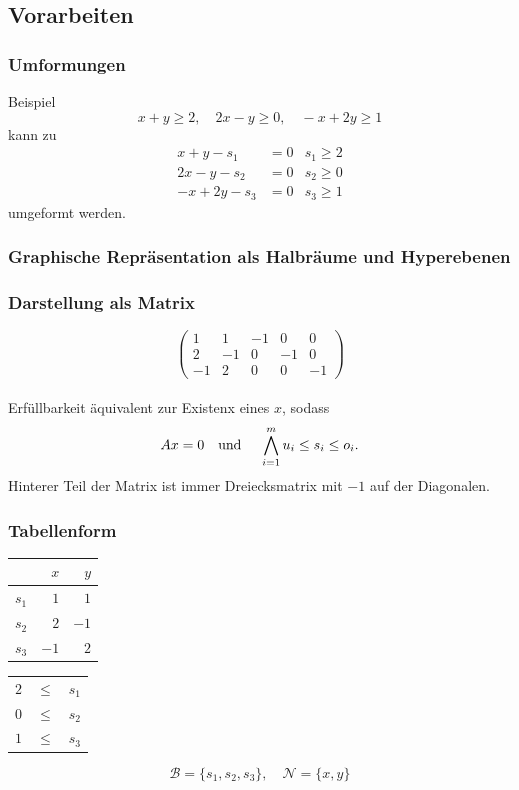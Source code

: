 \documentclass[hyperref={pdfpagelabels=false}]{beamer}
\begin{document}
\subsection{Vorarbeiten}
\begin{frame}
	\frametitle{Umformungen}
	\begin{block}{Beispiel}
		\[ x + y \geq 2, \quad 2x - y \geq 0, \quad -x + 2y \geq 1 \]
		kann zu
		\begin{align*}
			x + y - s_1 &= 0 & s_1 \geq 2 \\
			2x - y - s_2 &= 0 & s_2 \geq 0 \\
			-x + 2y - s_3 &= 0 & s_3 \geq 1
		\end{align*}
		umgeformt werden.
	\end{block}
\end{frame}
\begin{frame}
	\frametitle{Graphische Repräsentation als Halbräume und Hyperebenen}
	\begin{figure}
	\end{figure}
\end{frame}
\begin{frame}
	\frametitle{Darstellung als Matrix}
	\[
	\begin{pmatrix}
		1 & 1 & -1 & 0 & 0 \\
		2 & -1 & 0 & -1 & 0 \\
		-1 & 2 & 0 & 0 & -1
	\end{pmatrix}
	\]
	\mbox{}\\
	Erfüllbarkeit äquivalent zur Existenx eines $x$, sodass
	\[ Ax = 0 \text{\quad und \quad} \bigwedge_{i=1}^m u_i \leq s_i \leq o_i. \]
	Hinterer Teil der Matrix ist immer Dreiecksmatrix mit $-1$ auf der Diagonalen.
\end{frame}
\begin{frame}
	\frametitle{Tabellenform}
	\begin{center}
		\begin{tabular}{r|rr}
			& $x$ & $y$ \\ \hline
			$s_1$ & $1$ & $1$ \\
			$s_2$ & $2$ & $-1$ \\
			$s_3$ & $-1$ & $2$
		\end{tabular}
		\qquad
		\begin{tabular}{rrr}
			$2$ & $\leq$ & $s_1$ \\
			$0$ & $\leq$ & $s_2$ \\
			$1$ & $\leq$ & $s_3$
		\end{tabular}
		\[ \mathcal{B} = \{ s_1, s_2, s_3 \}, \quad \mathcal{N} = \{ x, y \} \]
	\end{center}
\end{frame}
\end{document}
